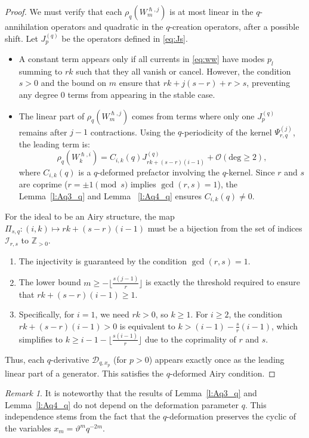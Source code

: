 \documentclass[reqno,11pt]{amsart}
\theoremstyle{plain}
\theoremstyle{definition}
\theoremstyle{remark}
\newtheorem{remark}[theorem]{Remark}
\numberwithin{equation}{section}
\renewcommand{\theta}{\vartheta}
\newcommand{\1}{\mathds{1}}
\newcommand{\2}{\frac{1}{2}}
\begin{document}
{\begin{proof}
					{We must verify that each $\rho_q(W^{\hslash,j}_m)$ is at most linear in the $q$-annihilation operators and quadratic in the $q$-creation operators, after a possible shift. Let $J^{(q)}_p$ be the operators defined in \eqref{eq:Js}.
						\begin{itemize}
							\item[(a)]  A constant term appears only if all currents in \eqref{eq:ww} have modes $p_l$ summing to $rk$ such that they all vanish or cancel. However, the condition $s > 0$ and the bound on $m$ ensure that $rk + j(s-r) + r > s$, preventing any degree 0 terms from appearing in the stable case.
							\item[(b)]  The linear part of $\rho_q(W^{\hslash,j}_m)$ comes from terms where only one $J^{(q)}_p$ remains after $j-1$ contractions. Using the $q$-periodicity of the kernel $\Psi^{(j)}_{r,q}$, the leading term is:
							\begin{equation}\label{eq:q_linear}
								\rho_q(W^{\hslash,i}_k) = C_{i,k}(q) J^{(q)}_{rk + (s-r)(i-1)} + \mathcal{O}(\text{deg} \geq 2),
							\end{equation}
							where $C_{i,k}(q)$ is a $q$-deformed prefactor involving the $q$-kernel. Since $r$ and $s$ are coprime ($r = \pm 1 \pmod{s}$ implies $\gcd(r,s)=1$), the  Lemma~\ref{l:Aq3_q} and Lemma ~\ref{l:Aq4_q} ensures $C_{i,k}(q) \neq 0$.
					\end{itemize}}
					{For the ideal to be an Airy structure, the map $\Pi_{s,q}: (i, k) \mapsto rk + (s-r)(i-1)$ must be a bijection from the set of indices $\mathcal{I}_{r,s}$ to $\mathbb{Z}_{>0}$. 
						\begin{enumerate}
							\item The injectivity is guaranteed by the condition $\gcd(r,s)=1$. 
							\item The lower bound $m \geq - \lfloor \frac{s(j-1)}{r} \rfloor$ is exactly the threshold required to ensure that $rk + (s-r)(i-1) \geq 1$. 
							\item Specifically, for $i=1$, we need $rk > 0$, so $k \geq 1$. For $i \geq 2$, the condition $rk + (s-r)(i-1) > 0$ is equivalent to $k > (i-1) - \frac{s}{r}(i-1)$, which simplifies to $k \geq i-1 - \lfloor \frac{s(i-1)}{r} \rfloor$ due to the coprimality of $r$ and $s$.
						\end{enumerate}
						Thus, each $q$-derivative $\mathcal
						{D}_{q,x_p}$ (for $p > 0$) appears exactly once as the leading linear part of a generator. This satisfies the $q$-deformed Airy condition.}
				\end{proof}
				\begin{remark}
					{It is noteworthy that the results of Lemma~\ref{l:Aq3_q} and Lemma~\ref{l:Aq4_q} do not depend on the deformation parameter $q$. This independence stems from the fact that the $q$-deformation preserves the cyclic of the variables $x_m = \theta^m q^{-2m}$.}
					

\end{remark}}
\end{document}
